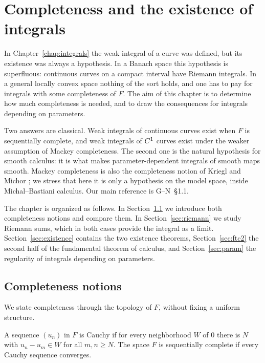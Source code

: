 \chapter{Completeness and the existence of integrals}
\label{chap:completeness}

In Chapter~\ref{chap:integrals} the weak integral of a curve was defined, but its existence was
always a hypothesis. In a Banach space this hypothesis is superfluous: continuous curves on a
compact interval have Riemann integrals. In a general locally convex space nothing of the sort
holds, and one has to pay for integrals with some completeness of $F$. The aim of this chapter
is to determine how much completeness is needed, and to draw the consequences for integrals
depending on parameters.

Two answers are classical. Weak integrals of continuous curves exist when $F$ is sequentially
complete, and weak integrals of $C^{1}$ curves exist under the weaker assumption of Mackey
completeness. The second one is the natural hypothesis for smooth calculus: it is what makes
parameter-dependent integrals of smooth maps smooth. Mackey completeness is also the completeness
notion of Kriegl and Michor \cite[\S 2]{KM97}; we stress that here it is only a hypothesis on
the model space, inside Michal--Bastiani calculus. Our main reference is G--N~\S1.1.

The chapter is organized as follows. In Section~\ref{sec:completeness-notions} we introduce
both completeness notions and compare them. In Section~\ref{sec:riemann} we study Riemann sums,
which in both cases provide the integral as a limit. Section~\ref{sec:existence} contains the
two existence theorems, Section~\ref{sec:ftc2} the second half of the fundamental theorem of
calculus, and Section~\ref{sec:param} the regularity of integrals depending on parameters.

\section{Completeness notions}
\label{sec:completeness-notions}

We state completeness through the topology of $F$, without fixing a uniform structure.

\begin{definition}
  \label{def:seq-complete}
  \leanok
  A sequence $(u_n)$ in $F$ is Cauchy if for every neighborhood $W$ of $0$ there is $N$ with
  $u_n - u_m \in W$ for all $m, n \geq N$. The space $F$ is sequentially complete if every
  Cauchy sequence converges.
\end{definition}

